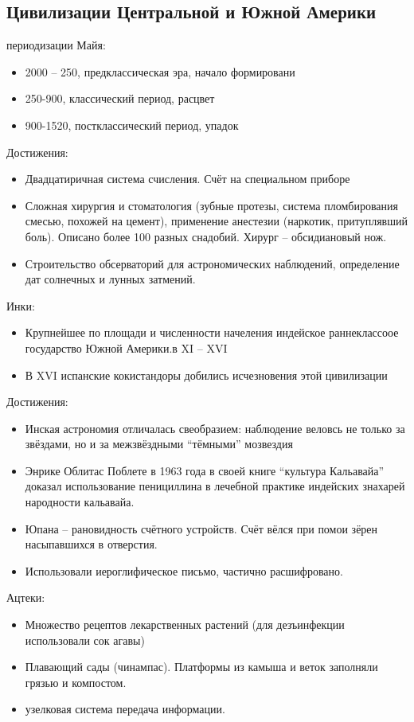 \documentclass{book}
\theoremstyle{definition}
\begin{document}
    \subsection{Цивилизации Центральной и Южной Америки}

    периодизации Майя:
    \begin{itemize}
        \item  2000 -- 250, предклассическая эра, начало формировани
        \item 250-900, классический период, расцвет
        \item 900-1520, постклассический период, упадок
    \end{itemize}

    Достижения:
    \begin{itemize}
        \item  Двадцатиричная система счисления. Счёт на специальном приборе
        \item Сложная хирургия и стоматология (зубные протезы, система пломбирования смесью, похожей на цемент), применение анестезии (наркотик, притуплявший боль). Описано более 100 разных снадобий. Хирург -- обсидиановый нож.
        \item Строительство обсерваторий для астрономических наблюдений, определение дат солнечных и лунных затмений.
    \end{itemize}

    Инки:
    \begin{itemize}
        \item Крупнейшее по площади и численности начеления индейское раннеклассоое государство Южной Америки.в XI -- XVI
        \item В XVI испанские кокистандоры добились исчезновения этой цивилизации
    \end{itemize}

    Достижения:
    \begin{itemize}
        \item Инская астрономия отличалась свеобразием: наблюдение веловсь не только за звёздами, но и за межзвёздными ``тёмными'' мозвездия
        \item Энрике Облитас Поблете в 1963 года в своей книге ``культура Кальавайа'' доказал использование пенициллина в лечебной практике индейских знахарей народности кальавайа.
        \item Юпана -- рановидность счётного устройств. Счёт вёлся при помои зёрен насыпавшихся в отверстия.
        \item Использовали иероглифическое письмо, частично расшифровано.
    \end{itemize}

    Ацтеки:
    \begin{itemize}
        \item Множество рецептов лекарственных растений (для дезъинфекции использовали сок агавы)
        \item Плавающий сады (чинампас). Платформы из камыша и веток заполняли грязью и компостом.
        \item узелковая система передача информации.
    \end{itemize}
\end{document}
